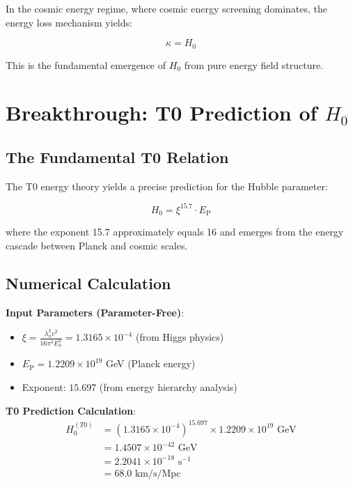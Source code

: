 \documentclass[12pt,a4paper]{article}
\newcommand{\Hzero}{H_0}
\newcommand{\kappaparam}{\kappa}
\newcommand{\EP}{E_{\text{P}}}
\begin{document}
	In the cosmic energy regime, where cosmic energy screening dominates, the energy loss mechanism yields:
	
	\begin{equation}
		\boxed{\kappaparam = \Hzero}
	\end{equation}
	
	This is the fundamental emergence of $H_0$ from pure energy field structure.
	
	\section{Breakthrough: T0 Prediction of $H_0$}
	
	\subsection{The Fundamental T0 Relation}
	
	The T0 energy theory yields a precise prediction for the Hubble parameter:
	
	\begin{equation}
		\boxed{H_0 = \xi^{15.7} \cdot \EP}
		\label{eq:h0_fundamental_prediction}
	\end{equation}
	
	where the exponent 15.7 approximately equals 16 and emerges from the energy cascade between Planck and cosmic scales.
	
	\subsection{Numerical Calculation}
	
	\textbf{Input Parameters (Parameter-Free)}:
	\begin{itemize}
		\item $\xi = \frac{\lambda_h^2 v^2}{16\pi^3 E_h^2} = 1.3165 \times 10^{-4}$ (from Higgs physics)
		\item $\EP = 1.2209 \times 10^{19}$ GeV (Planck energy)
		\item Exponent: $15.697$ (from energy hierarchy analysis)
	\end{itemize}
	
	\textbf{T0 Prediction Calculation}:
	\begin{align}
		H_0^{(T0)} &= (1.3165 \times 10^{-4})^{15.697} \times 1.2209 \times 10^{19} \text{ GeV} \nonumber \\
		&= 1.4507 \times 10^{-42} \text{ GeV} \nonumber \\
		&= 2.2041 \times 10^{-18} \text{ s}^{-1} \nonumber \\
		&= \boxed{68.0 \text{ km/s/Mpc}}
		\label{eq:h0_t0_calculation}
	\end{align}
	
\end{document}
